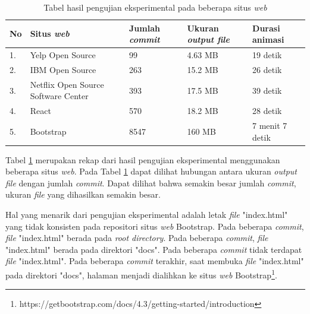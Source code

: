 \begin{table}[htbp]
	\centering
	\caption{Tabel hasil pengujian eksperimental pada beberapa situs \textit{web}}
	
		\begin{tabular}{|p{0.3cm}| p{5 cm}| p{3 cm }|p{3 cm}| p{3 cm}|} \hline
		No & Situs \textit{web}	& Jumlah \textit{commit} &Ukuran \textit{output file}  & Durasi animasi \\ \hline
		1. & Yelp Open Source & 99 &4.63 MB  & 19 detik\\ \hline
		2. & IBM Open Source & 263&15.2 MB  & 26 detik	\\ \hline	
		3. & Netflix Open Source Software Center & 393 &17.5 MB & 39 detik  \\ \hline
		4. & React & 570 & 18.2 MB  & 28 detik \\ \hline
		5. & Bootstrap & 8547 &160 MB & 7 menit 7 detik  \\ \hline
		\end{tabular}
	\label{table:hasil_eksperimental}
\end{table}

Tabel \ref{table:hasil_eksperimental} merupakan rekap dari hasil pengujian eksperimental menggunakan beberapa situs \textit{web}. Pada Tabel \ref{table:hasil_eksperimental} dapat dilihat hubungan antara ukuran \textit{output file} dengan jumlah \textit{commit}. Dapat dilihat bahwa semakin besar jumlah \textit{commit}, ukuran \textit{file} yang dihasilkan semakin besar.

Hal yang menarik dari pengujian eksperimental adalah letak \textit{file} "index.html" yang tidak konsisten pada repositori situs \textit{web} Bootstrap. Pada beberapa \textit{commit}, \textit{file} "index.html" berada pada \textit{root directory}. Pada beberapa \textit{commit}, \textit{file} "index.html" berada pada direktori "docs". Pada beberapa \textit{commit} tidak terdapat \textit{file} "index.html". Pada beberapa \textit{commit} terakhir, saat membuka \textit{file} "index.html" pada direktori "docs", halaman menjadi dialihkan ke situs \textit{web} Bootstrap\footnote{https://getbootstrap.com/docs/4.3/getting-started/introduction}.


